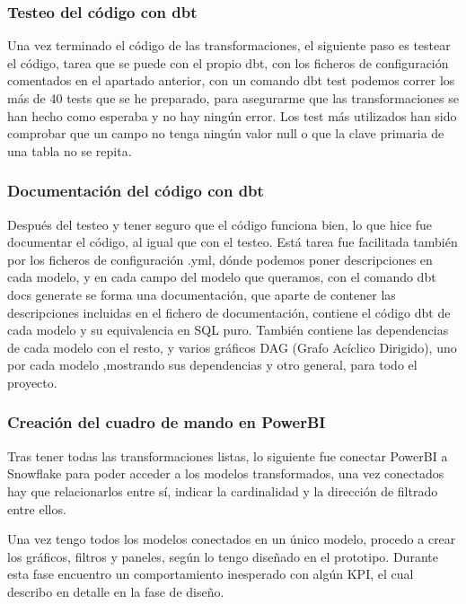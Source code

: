 
\subsubsection{Testeo del código con dbt}

Una vez terminado el código de las transformaciones, el siguiente paso es testear el código, tarea que se puede con el propio dbt, con los ficheros de configuración comentados en el apartado anterior, con un comando dbt test podemos correr los más de 40 tests que se he preparado, para asegurarme que las transformaciones se han hecho como esperaba y no hay ningún error. Los test más utilizados han sido comprobar que un campo no tenga ningún valor null o que la clave primaria de una tabla no se repita.

\subsubsection{Documentación del código con dbt}

Después del testeo y tener seguro que el código funciona bien, lo que hice fue documentar el código, al igual que con el testeo. Está tarea fue facilitada también por los ficheros de configuración .yml, dónde podemos poner descripciones en cada modelo, y en cada campo del modelo que queramos, con el comando dbt docs generate se forma una documentación, que aparte de contener las descripciones incluidas en el fichero de documentación, contiene el código dbt de cada modelo y su equivalencia en SQL puro. También contiene las dependencias de cada modelo con el resto, y varios gráficos DAG (Grafo Acíclico Dirigido), uno por cada modelo ,mostrando sus dependencias y otro general, para todo el proyecto.


\subsubsection{Creación del cuadro de mando en PowerBI}

Tras tener todas las transformaciones listas, lo siguiente fue conectar PowerBI a Snowflake para poder acceder a los modelos transformados, una vez conectados hay que relacionarlos entre sí, indicar la cardinalidad y la dirección de filtrado entre ellos.

Una vez tengo todos los modelos conectados en un único modelo, procedo a crear los gráficos, filtros y paneles, según lo tengo diseñado en el prototipo. Durante esta fase encuentro un comportamiento inesperado con algún KPI, el cual describo en detalle en la fase de diseño.

